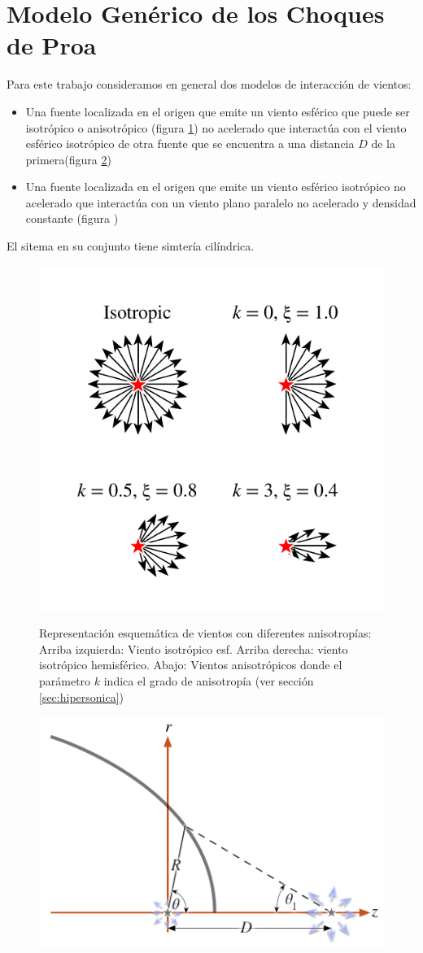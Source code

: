 \section{Modelo Genérico de los Choques de Proa}
\label{sec:Modelo-generico}
Para este trabajo consideramos en general dos modelos de
interacci\'on  de vientos:
\begin{itemize}
\item Una fuente localizada en el origen que emite un viento esf\'erico
  que puede ser isotr\'opico o anisotr\'opico (figura
  \ref{fig:isotropic-aniso}) no acelerado que interact\'ua con el viento
  esf\'erico isotr\'opico de otra fuente que se encuentra a una distancia
  $D$ de la primera(figura \ref{fig:crw-esquema})
\item Una fuente localizada en el origen que emite un viento esf\'erico
  isotr\'opico no acelerado que interact\'ua con un viento plano paralelo
  no acelerado y densidad constante (figura )
\end{itemize}
El sitema en su conjunto tiene simter\'ia cil\'indrica.
\begin{figure}
  \includegraphics[width=0.5\linewidth]{./Figures/anisotropic-arrows}
  \label{fig:isotropic-aniso}
  \caption{Representaci\'on esquem\'atica de vientos con diferentes
    anisotrop\'ias:
    Arriba izquierda: Viento isotr\'opico esf. Arriba derecha: viento
    isotr\'opico hemisf\'erico. Abajo: Vientos anisotr\'opicos donde el
    par\'ametro $k$ indica el grado de anisotrop\'ia (ver secci\'on
    \ref{sec:hipersonica})}
\end{figure}
\begin{figure}
  \includegraphics[width=0.5\linewidth]{./Figures/bowshock-crw-variables}
  \label{fig:crw-esquema}
\end{figure}

